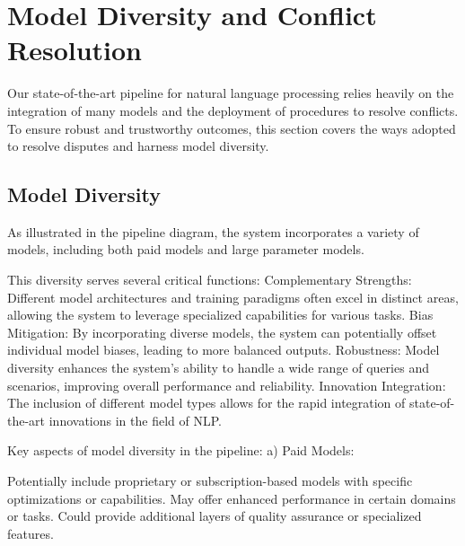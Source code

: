 %
%

\section{Model Diversity and Conflict Resolution}\label{sec:model-diversity-and-conflict-resolution}
Our state-of-the-art pipeline for natural language processing relies heavily on the integration of many models and the deployment of procedures to resolve conflicts.
To ensure robust and trustworthy outcomes, this section covers the ways adopted to resolve disputes and harness model diversity.

\subsection{Model Diversity}\label{subsec:model-diversity}
As illustrated in the pipeline diagram, the system incorporates a variety of models, including both paid models and large parameter models.

This diversity serves several critical functions:
Complementary Strengths: Different model architectures and training paradigms often excel in distinct areas, allowing the system to leverage specialized capabilities for various tasks.
Bias Mitigation: By incorporating diverse models, the system can potentially offset individual model biases, leading to more balanced outputs.
Robustness: Model diversity enhances the system's ability to handle a wide range of queries and scenarios, improving overall performance and reliability.
Innovation Integration: The inclusion of different model types allows for the rapid integration of state-of-the-art innovations in the field of NLP.

Key aspects of model diversity in the pipeline:
a) Paid Models:

Potentially include proprietary or subscription-based models with specific optimizations or capabilities.
May offer enhanced performance in certain domains or tasks.
Could provide additional layers of quality assurance or specialized features.

